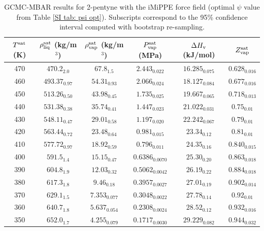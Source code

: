 \documentclass[journal=jctc,manuscript=article]{achemso}
\begin{document}
\begin{table}[htb!]
	\caption{GCMC-MBAR results for 2-pentyne with the iMiPPE force field (optimal $\psi$ value from Table \ref{SI tab: psi opt}). Subscripts correspond to the 95\% confidence interval computed with bootstrap re-sampling.}
	\begin{center}
		\begin{tabular}{|c|c|c|c|c|c|}
			\hline
			$T^{\rm sat}$ (K) & $\rho_{\rm liq}^{\rm sat}$ (kg/m$^3$) & $\rho_{\rm vap}^{\rm sat}$ (kg/m$^3$) & $P_{\rm vap}^{\rm sat}$ (MPa) & $\Delta H_{\rm v}$ (kJ/mol) & $Z_{\rm vap}^{\rm sat}$ \\ \hline
			470 & $470.2_{2.0}$ & $67.8_{1.5}$ & $2.443_{0.022}$ & $16.285_{0.075}$ & $0.628_{0.016}$ \\
			460 & $493.37_{0.97}$ & $54.31_{0.93}$ & $2.066_{0.024}$ & $18.127_{0.084}$ & $0.677_{0.016}$ \\
			450 & $513.26_{0.50}$ & $43.98_{0.45}$ & $1.735_{0.025}$ & $19.667_{0.065}$ & $0.718_{0.013}$ \\
			440 & $531.38_{0.38}$ & $35.74_{0.41}$ & $1.447_{0.023}$ & $21.022_{0.031}$ & $0.75_{0.01}$ \\
			430 & $548.11_{0.47}$ & $29.01_{0.58}$ & $1.197_{0.020}$ & $22.242_{0.067}$ & $0.79_{0.01}$ \\
			420 & $563.44_{0.72}$ & $23.48_{0.64}$ & $0.981_{0.015}$ & $23.34_{0.12}$ & $0.81_{0.01}$ \\
			410 & $577.72_{0.97}$ & $18.92_{0.59}$ & $0.796_{0.011}$ & $24.35_{0.16}$ & $0.840_{0.015}$ \\
			400 & $591.5_{1.4}$ & $15.15_{0.47}$ & $0.6386_{0.0070}$ & $25.30_{0.20}$ & $0.863_{0.018}$ \\
			390 & $604.8_{1.9}$ & $12.03_{0.32}$ & $0.5062_{0.0042}$ & $26.19_{0.22}$ & $0.884_{0.018}$ \\
			380 & $617.3_{1.8}$ & $9.46_{0.18}$ & $0.3957_{0.0027}$ & $27.01_{0.19}$ & $0.902_{0.014}$ \\
			370 & $629.1_{1.5}$ & $7.353_{0.077}$ & $0.3048_{0.0022}$ & $27.78_{0.14}$ & $0.92_{0.01}$ \\
			360 & $640.7_{1.8}$ & $5.637_{0.054}$ & $0.2308_{0.0024}$ & $28.52_{0.12}$ & $0.932_{0.016}$ \\
			350 & $652.0_{1.7}$ & $4.255_{0.079}$ & $0.1717_{0.0030}$ & $29.229_{0.082}$ & $0.944_{0.032}$ \\
			\hline
		\end{tabular}
	\end{center}
\end{table}
\end{document}
